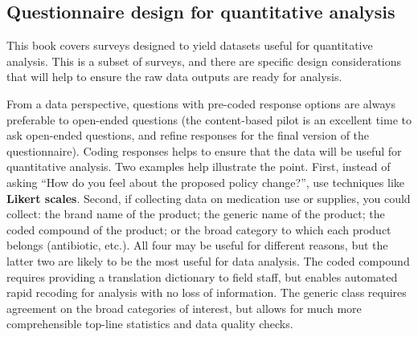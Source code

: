 \subsection{Questionnaire design for quantitative analysis}
This book covers surveys designed to yield datasets useful for quantitative analysis. This is a subset of surveys, and there are specific design considerations that will help to ensure the raw data outputs are ready for analysis. 

From a data perspective, questions with pre-coded response options are always preferable to open-ended questions (the content-based pilot is an excellent time to ask open-ended questions, and refine responses for the final version of the questionnaire). Coding responses helps to ensure that the data will be useful for quantitative analysis. Two examples help illustrate the point. First, instead of asking ``How do you feel about the proposed policy change?'', use techniques like 
\textbf{Likert scales}. Second, if collecting data on medication use or supplies, you could collect: the brand name of the product; the generic name of the product; the coded compound of the product; or the broad category to which each product belongs (antibiotic, etc.). All four may be useful for different reasons, but the latter two are likely to be the most useful for data analysis. The coded compound requires providing a translation dictionary to field staff, but enables automated rapid recoding for analysis with no loss of information. The generic class requires agreement on the broad categories of interest, but allows for much more comprehensible top-line statistics and data quality checks.

